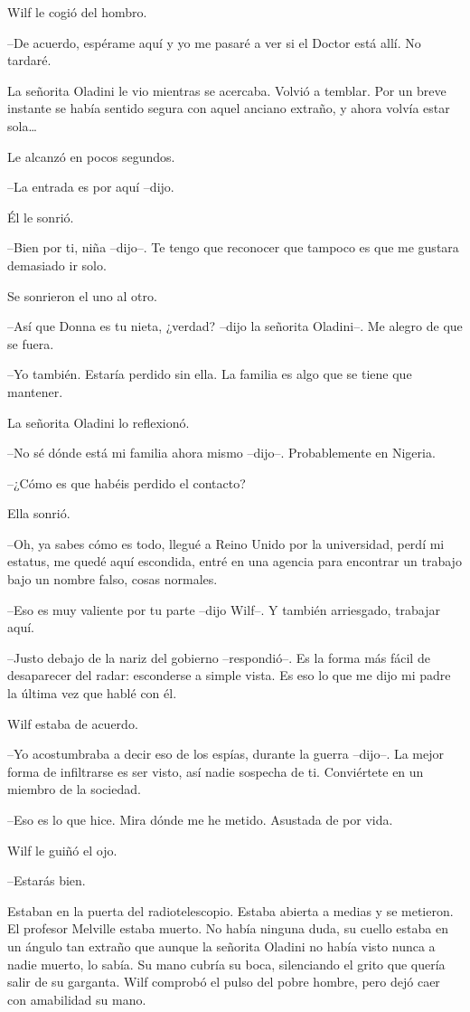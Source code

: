Wilf le cogió del hombro.

--De acuerdo, espérame aquí y yo me pasaré a ver si el Doctor está allí.
No tardaré.

La señorita Oladini le vio mientras se acercaba. Volvió a temblar. Por
un breve instante se había sentido segura con aquel anciano extraño, y
ahora volvía estar sola\ldots{}

Le alcanzó en pocos segundos.

--La entrada es por aquí --dijo.

Él le sonrió.

--Bien por ti, niña --dijo--. Te tengo que reconocer que tampoco es que
me gustara demasiado ir solo.

Se sonrieron el uno al otro.

--Así que Donna es tu nieta, ¿verdad? --dijo la señorita Oladini--. Me
alegro de que se fuera.

--Yo también. Estaría perdido sin ella. La familia es algo que se tiene
que mantener.

La señorita Oladini lo reflexionó.

--No sé dónde está mi familia ahora mismo --dijo--. Probablemente en
Nigeria.

--¿Cómo es que habéis perdido el contacto?

Ella sonrió.

--Oh, ya sabes cómo es todo, llegué a Reino Unido por la universidad,
perdí mi estatus, me quedé aquí escondida, entré en una agencia para
encontrar un trabajo bajo un nombre falso, cosas normales.

--Eso es muy valiente por tu parte --dijo Wilf--. Y también arriesgado,
trabajar aquí.

--Justo debajo de la nariz del gobierno --respondió--. Es la forma más
fácil de desaparecer del radar: esconderse a simple vista. Es eso lo que
me dijo mi padre la última vez que hablé con él.

Wilf estaba de acuerdo.

--Yo acostumbraba a decir eso de los espías, durante la guerra --dijo--.
La mejor forma de infiltrarse es ser visto, así nadie sospecha de ti.
Conviértete en un miembro de la sociedad.

--Eso es lo que hice. Mira dónde me he metido. Asustada de por vida.

Wilf le guiñó el ojo.

--Estarás bien.

Estaban en la puerta del radiotelescopio. Estaba abierta a medias y se
metieron. El profesor Melville estaba muerto. No había ninguna duda, su
cuello estaba en un ángulo tan extraño que aunque la señorita Oladini no
había visto nunca a nadie muerto, lo sabía. Su mano cubría su boca,
silenciando el grito que quería salir de su garganta. Wilf comprobó el
pulso del pobre hombre, pero dejó caer con amabilidad su mano.

